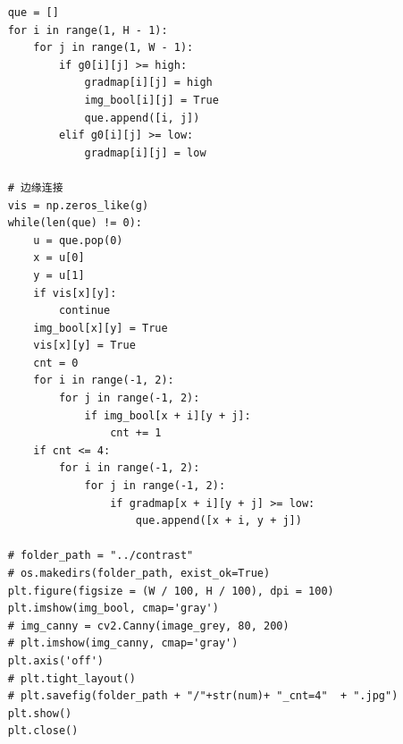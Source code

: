 \documentclass{article}
\begin{document}
\begin{lstlisting}
    que = []
    for i in range(1, H - 1):
        for j in range(1, W - 1):
            if g0[i][j] >= high:
                gradmap[i][j] = high
                img_bool[i][j] = True
                que.append([i, j])
            elif g0[i][j] >= low:
                gradmap[i][j] = low

    # 边缘连接
    vis = np.zeros_like(g)
    while(len(que) != 0):
        u = que.pop(0)
        x = u[0]
        y = u[1]
        if vis[x][y]:
            continue
        img_bool[x][y] = True
        vis[x][y] = True
        cnt = 0
        for i in range(-1, 2):
            for j in range(-1, 2):
                if img_bool[x + i][y + j]:
                    cnt += 1
        if cnt <= 4:
            for i in range(-1, 2):
                for j in range(-1, 2):
                    if gradmap[x + i][y + j] >= low:
                        que.append([x + i, y + j])

    # folder_path = "../contrast"
    # os.makedirs(folder_path, exist_ok=True)
    plt.figure(figsize = (W / 100, H / 100), dpi = 100)
    plt.imshow(img_bool, cmap='gray')
    # img_canny = cv2.Canny(image_grey, 80, 200)
    # plt.imshow(img_canny, cmap='gray')
    plt.axis('off')
    # plt.tight_layout()
    # plt.savefig(folder_path + "/"+str(num)+ "_cnt=4"  + ".jpg")
    plt.show()
    plt.close()
\end{lstlisting}
\end{document}
